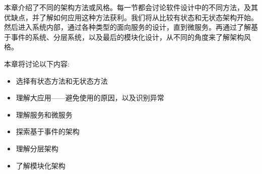 本章介绍了不同的架构方法或风格。每一节都会讨论软件设计中的不同方法，及其优缺点，并了解如何应用这种方法获利。我们将从比较有状态和无状态架构开始。然后进入系统内部，通过各种类型的面向服务的设计，直到微服务。再通过了解基于事件的系统、分层系统，以及最后的模块化设计，从不同的角度来了解架构风格。


本章将讨论以下内容:

\begin{itemize}
\item 选择有状态方法和无状态方法
\item 理解大应用——避免使用的原因，以及识别异常
\item 理解服务和微服务
\item 探索基于事件的架构
\item 理解分层架构
\item 了解模块化架构

\end{itemize}